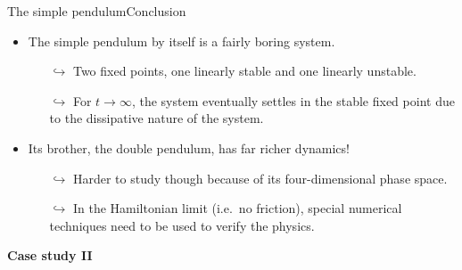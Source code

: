 \documentclass[usenames,dvipsnames,svgnames,10pt,aspectratio=169]{beamer}
\begin{document}
\begin{frame}[t, c]{The simple pendulum}{Conclusion}
	\begin{minipage}{.68\textwidth}
		\begin{itemize}
			\item The simple pendulum by itself is a fairly boring system.
			\begin{itemize}
				\item[\( \hookrightarrow \)] Two fixed points, one linearly stable and one linearly unstable.
				\item[\( \hookrightarrow \)] For \( t \to \infty \), the system eventually settles in the stable fixed point due to the dissipative nature of the system.
			\end{itemize}

			\bigskip

			\item Its brother, the double pendulum, has far richer dynamics!
			\begin{itemize}
				\item[\( \hookrightarrow \)] Harder to study though because of its four-dimensional phase space.
				\item[\( \hookrightarrow \)] In the Hamiltonian limit (i.e.\ no friction), special numerical techniques need to be used to verify the physics.
			\end{itemize}
		\end{itemize}
	\end{minipage}%
	\hfill
	\begin{minipage}{.28\textwidth}

	\end{minipage}

	\vspace{1cm}
\end{frame}

\begin{frame}[t, c]{}{}
	\centering

	{\Large \textbf{Case study II}}

	\bigskip


	\vspace{-2cm}
\end{frame}
\end{document}
